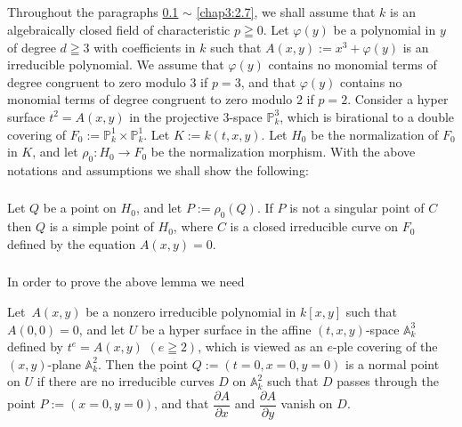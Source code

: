\subsection{}\label{chap3:2.4}
Throughout the paragraphs \ref{chap3:2.4} $\sim$ \ref{chap3:2.7}, we shall assume
that $k$ is an algebraically closed field of characteristic $p\geqq
0$. Let $\varphi(y)$ be a polynomial in $y$ of degree $d\geqq 3$ with
coefficients in $k$ such that $A(x,y):=x^{3}+\varphi(y)$ is an
irreducible polynomial. We assume that $\varphi(y)$ contains no
monomial terms of degree congruent to zero modulo $3$ if $p=3$, and
that $\varphi(y)$ contains no monomial terms of degree congruent to
zero modulo $2$ if $p=2$. Consider a hyper surface $t^{2}=A(x,y)$ in
the projective $3$-space $\mathbb{P}^{3}_{k}$, which is birational to
a double covering of $F_{0}:=\mathbb{P}^{1}_{k}\times
\mathbb{P}^{1}_{k}$. Let $K:=k(t,x,y)$. Let $H_{0}$ be the
normalization of $F_{0}$ in $K$, and let $\rho_{0}:H_{0}\to F_{0}$ be
the normalization morphism. With the above notations and assumptions
we shall show the following:

\subsubsection{}\label{chap3:2.4.1}
\begin{lemma*}
  Let $Q$ be a point on $H_{0}$, and let $P:=\rho_{0}(Q)$. If $P$ is not
  a singular point of $C$ then $Q$ is a simple point of $H_{0}$, where
  $C$ is a closed irreducible curve on $F_{0}$ defined by the equation
  $A(x,y)=0$. 
\end{lemma*}

\subsubsection{}\label{chap3:2.4.2}
In order to prove the above lemma we need 

\begin{lemma*}
Let\pageoriginale\ $A(x,y)$ be a nonzero irreducible polynomial in
$k[x,y]$ such that $A(0,0)=0$, and let $U$ be a hyper surface in the
affine $(t,x,y)$-space $\mathbb{A}^{3}_{k}$ defined by $t^{e}=A(x,y)$
$(e\geqq 2)$, which is viewed as an $e$-ple covering of the
$(x,y)$-plane $\mathbb{A}^{2}_{k}$. Then the point $Q:=(t=0,x=0,y=0)$
is a normal point on $U$ if there are no irreducible curves $D$ on
$\mathbb{A}^{2}_{k}$ such that $D$ passes through the point
$P:=(x=0,y=0)$, and that $\dfrac{\partial A}{\partial x}$ and
$\dfrac{\partial A}{\partial y}$ vanish on $D$.
\end{lemma*}

